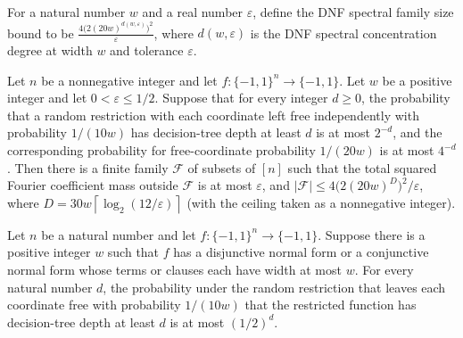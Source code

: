 \begin{definition}
\label{FABL.dnfSpectralFamilySizeBound}
\leanok
{}
For a natural number $w$ and a real number $\varepsilon$, define the DNF spectral family
size bound to be $\frac{4\bigl(2(20w)^{d(w,\varepsilon)}\bigr)^2}{\varepsilon}$, where
$d(w,\varepsilon)$ is the DNF spectral concentration degree at width $w$ and tolerance
$\varepsilon$.
\end{definition}

\begin{theorem}
\label{FABL.theorem4_25_of_switchingFailureProbability_bounds}
\leanok
{}
Let $n$ be a nonnegative integer and let $f:\{-1,1\}^n\to\{-1,1\}$. Let $w$ be a
positive integer and let $0<\varepsilon\le 1/2$. Suppose that for every integer $d\ge0$,
the probability that a random restriction with each coordinate left free independently
with probability $1/(10w)$ has decision-tree depth at least $d$ is at most $2^{-d}$, and
the corresponding probability for free-coordinate probability $1/(20w)$ is at most
$4^{-d}$. Then there is a finite family $\mathcal F$ of subsets of $[n]$ such that the
total squared Fourier coefficient mass outside $\mathcal F$ is at most $\varepsilon$,
and $|\mathcal F|\le 4\bigl(2(20w)^D\bigr)^2/\varepsilon$, where
$D=30w\left\lceil\log_2(12/\varepsilon)\right\rceil$ (with the ceiling taken as a
nonnegative integer).
\end{theorem}

\begin{theorem}
\label{FABL.hastadHalfSwitchingBound}
\leanok
{}
Let $n$ be a natural number and let $f:\{-1,1\}^n\to\{-1,1\}$. Suppose there is a
positive integer $w$ such that $f$ has a disjunctive normal form or a conjunctive normal
form whose terms or clauses each have width at most $w$. For every natural number $d$,
the probability under the random restriction that leaves each coordinate free with
probability $1/(10w)$ that the restricted function has decision-tree depth at least $d$
is at most $(1/2)^d$.
\end{theorem}

